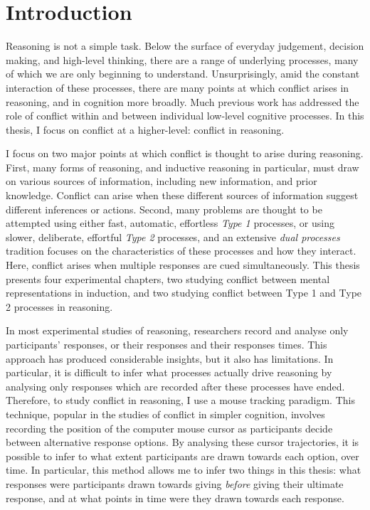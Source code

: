
\section{Introduction}\label{sec:chapter1-intro}

Reasoning is not a simple task.
Below the surface of everyday judgement, decision making, and high-level thinking,
there are a range of underlying processes,
many of which we are only beginning to understand.
Unsurprisingly, amid the constant interaction of these processes,
there are many points at which conflict arises in reasoning,
and in cognition more broadly.
Much previous work
\citep{Botvinick2004a,Veen2006,Spivey2007}
has addressed the role of conflict
within and between individual low-level cognitive processes.
In this thesis, I focus on conflict at a higher-level:
conflict in reasoning.

I focus on two major points at which conflict
is thought to arise during reasoning.
First, many forms of reasoning,
and inductive reasoning in particular,
must draw on various sources of information,
including new information, and prior knowledge.
Conflict can arise when these different sources of information
suggest different inferences or actions.
Second, many problems are thought to be attempted using either
fast, automatic, effortless \emph{Type 1} processes,
or using slower, deliberate, effortful \emph{Type 2} processes,
and an extensive \emph{dual processes} tradition
focuses on the characteristics of these processes and how they interact.
Here, conflict arises when multiple responses are cued simultaneously.
This thesis presents four experimental chapters,
two studying conflict between mental representations in induction,
and two studying conflict between Type 1 and Type 2 processes in reasoning.

In most experimental studies of reasoning,
researchers record and analyse only participants' responses,
or their responses and their responses times.
This approach has produced considerable insights,
but it also has limitations.
In particular, it is difficult to infer
what processes actually drive reasoning
by analysing only responses which are recorded
after these processes have ended.
Therefore, to study  conflict in reasoning,
I use a mouse tracking paradigm.
This technique, popular in the studies of conflict in simpler cognition,
involves recording the position of the computer mouse cursor
as participants decide between alternative response options.
By analysing these cursor trajectories,
it is possible to infer to what extent participants
are drawn towards each option, over time.
In particular, this method allows me to infer two things in this thesis:
what responses were participants drawn towards giving
\emph{before} giving their ultimate response,
and at what points in time were they drawn towards each response.

